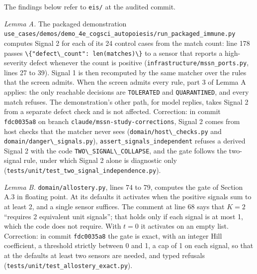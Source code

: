 \documentclass[
  11pt,
]{article}
\newcommand{\passthrough}[1]{#1}
\begin{document}
The findings below refer to
\nolinkurl{eis/} at the audited commit.

\emph{Lemma A.} The packaged demonstration
\nolinkurl{use_cases/demos/demo_4e_cogsci_autopoiesis/run_packaged_immune.py}
computes Signal 2 for each of its 24 control cases from the match count:
line 178 passes
\passthrough{\lstinline!\{"defect\_count": len(matches)\}!} to a sensor
that reports a high-severity defect whenever the count is positive
(\nolinkurl{infrastructure/mssn_ports.py}, lines 27 to 39). Signal 1 is
then recomputed by the same matcher over the rules that the screen
admits. When the screen admits every rule, part 3 of Lemma A applies:
the only reachable decisions are \passthrough{\lstinline!TOLERATED!} and
\passthrough{\lstinline!QUARANTINED!}, and every match refuses. The
demonstration's other path, for model replies, takes Signal 2 from a
separate defect check and is not affected. Correction: in commit
\passthrough{\lstinline!fdc0035a8!} on branch
\nolinkurl{claude/mssn-study-corrections}, Signal 2 comes from host
checks that the matcher never sees
(\passthrough{\lstinline!domain/host\_checks.py!} and
\passthrough{\lstinline!domain/danger\_signals.py!}),
\nolinkurl{assert_signals_independent} refuses a derived Signal 2 with
the code \passthrough{\lstinline!TWO\_SIGNAL\_COLLAPSE!}, and the gate
follows the two-signal rule, under which Signal 2 alone is diagnostic
only (\nolinkurl{tests/unit/test_two_signal_independence.py}).

\emph{Lemma B.} \passthrough{\lstinline!domain/allostery.py!}, lines 74
to 79, computes the gate of Section A.3 in floating point. At its
defaults it activates when the positive signals sum to at least 2, and a
single sensor suffices. The comment at line 68 says that \(K = 2\)
``requires 2 equivalent unit signals''; that holds only if each signal
is at most 1, which the code does not require. With \(t = 0\) it
activates on an empty list. Correction: in commit
\passthrough{\lstinline!fdc0035a8!} the gate is exact, with an integer
Hill coefficient, a threshold strictly between 0 and 1, a cap of 1 on
each signal, so that at the defaults at least two sensors are needed,
and typed refusals (\nolinkurl{tests/unit/test_allostery_exact.py}).
\end{document}
